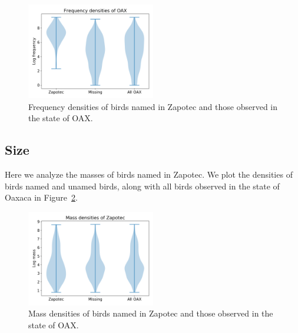 \documentclass[10pt,letterpaper]{article}
\begin{document}
\begin{figure}[h!]
  \begin{center}
    \includegraphics[width=0.5\textwidth]{./figures/birdfreq-violinplots.png}
        \caption{Frequency densities of birds named in Zapotec and those observed in the state of OAX.}
        \label{fig-birdfreqviolin}
  \end{center}
\end{figure}

\subsection{Size}
Here we analyze the masses of birds named in Zapotec. We plot the densities of birds named and unamed birds, along with all birds observed in the state of Oaxaca in Figure~\ref{fig-birdmassviolin}.

\begin{figure}[h!]
  \begin{center}
    \includegraphics[width=0.5\textwidth]{./figures/birdmass-violinplots.png}
        \caption{Mass densities of birds named in Zapotec and those observed in the state of OAX.}
        \label{fig-birdmassviolin}
  \end{center}
\end{figure}
\end{document}
